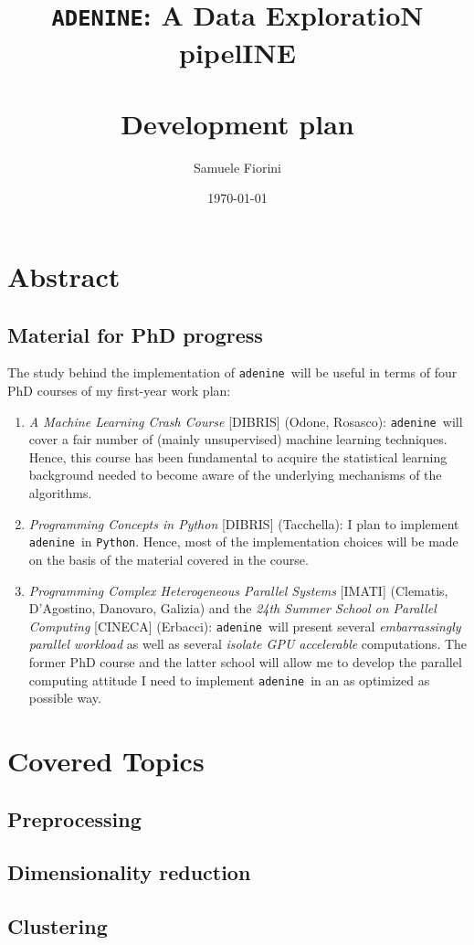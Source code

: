\documentclass[paper=a4, fontsize=10pt]{scrartcl} %
\title{	
\normalfont \normalsize
\huge{\tt ADENINE}: A Data ExploratioN pipelINE \\
\horrule{2pt} \\[0.5cm] %
Development plan \\ %
}
\author{Samuele Fiorini} %
\date{\normalsize\today} %
\numberwithin{equation}{section} %
\numberwithin{figure}{section} %
\numberwithin{table}{section} %
\newcommand{\adenine}{{\tt adenine}~}
\begin{document}
\maketitle %


\section{Abstract}



\subsection{Material for PhD progress}

The study behind the implementation of \adenine  will be useful in terms of
four PhD courses of my first-year work plan:

\begin{enumerate}

	\item {\sl A Machine Learning Crash Course} [DIBRIS] (Odone, Rosasco): \adenine will cover
	a fair number of (mainly unsupervised) machine learning techniques. Hence, this course
	has been fundamental to acquire the statistical learning background needed to become aware of
	the underlying mechanisms of the algorithms.

	\item {\sl Programming Concepts in Python} [DIBRIS] (Tacchella):  I plan to implement \adenine in
	{\tt Python}. Hence,  most of the implementation choices will be made on the basis of the material
	covered in the course.

  	\item {\sl Programming Complex Heterogeneous Parallel Systems} [IMATI]
	(Clematis,   D'Agostino, Danovaro, Galizia) and {the \sl 24th Summer School on
	Parallel Computing} [CINECA] (Erbacci): \adenine will present several {\sl embarrassingly
	parallel workload} as well as several {\sl isolate GPU accelerable} computations. 
	The former PhD course and the latter school will allow me to develop the parallel computing
	attitude I need to implement \adenine in an as optimized as possible way.

\end{enumerate}


\section{Covered Topics}

\subsection{Preprocessing}
\subsection{Dimensionality reduction}
\subsection{Clustering}


\end{document}
